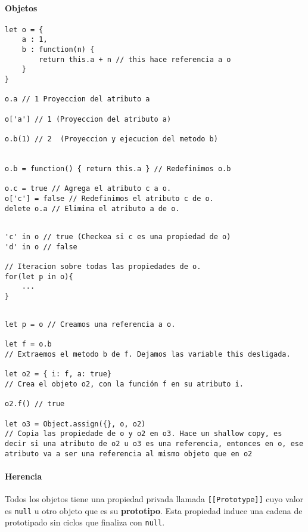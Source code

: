\paragraph{Objetos}
\begin{centrado}
\begin{verbatim}
let o = {
    a : 1,
    b : function(n) {
        return this.a + n // this hace referencia a o
    }
}

o.a // 1 Proyeccion del atributo a

o['a'] // 1 (Proyeccion del atributo a)

o.b(1) // 2  (Proyeccion y ejecucion del metodo b)


o.b = function() { return this.a } // Redefinimos o.b

o.c = true // Agrega el atributo c a o.
o['c'] = false // Redefinimos el atributo c de o.
delete o.a // Elimina el atributo a de o.


\end{verbatim}
\end{centrado}

\begin{centrado}
\begin{verbatim}
'c' in o // true (Checkea si c es una propiedad de o)
'd' in o // false

// Iteracion sobre todas las propiedades de o.
for(let p in o){
    ...
}
\end{verbatim}
\end{centrado}
\begin{centrado}
\begin{verbatim}

let p = o // Creamos una referencia a o.

let f = o.b 
// Extraemos el metodo b de f. Dejamos las variable this desligada.

let o2 = { i: f, a: true} 
// Crea el objeto o2, con la función f en su atributo i.

o2.f() // true

let o3 = Object.assign({}, o, o2) 
// Copia las propiedade de o y o2 en o3. Hace un shallow copy, es decir si una atributo de o2 u o3 es una referencia, entonces en o, ese atributo va a ser una referencia al mismo objeto que en o2
\end{verbatim}
\end{centrado}

\paragraph{Herencia}
Todos los objetos tiene una propiedad privada llamada \texttt{[[Prototype]]} cuyo valor es \texttt{null} u otro objeto que es su \textbf{prototipo}. Esta propiedad induce una cadena de prototipado sin ciclos que finaliza con \texttt{null}.

